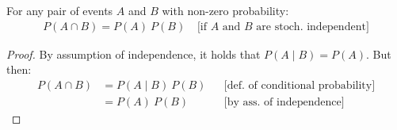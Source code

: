 \documentclass[nobib,nofonts]{tufte-handout}
\begin{document}
\begin{claim}
  For any pair of events $A$ and $B$ with non-zero probability:
  \begin{align*}
    P(A \cap B) = P(A) \ P(B) \, \ \ \ \ \text{[if } A \text{ and } B \text{ are stoch. independent]}
  \end{align*}
\end{claim}

\begin{proof}
  By assumption of independence, it holds that $P(A \mid B) = P(A)$. But then:
  \begin{align*}
    P(A \cap B)
    & =
    P(A \mid B) \ P(B) && \text{[def. of conditional probability]}
    \\
    & =
    P(A) \ P(B) && \text{[by ass. of independence]}
  \end{align*}
\end{proof}

\end{document}
